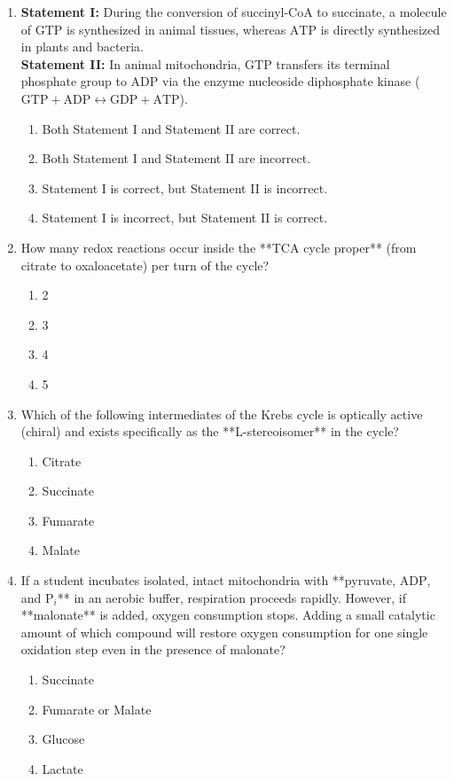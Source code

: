 \documentclass[11pt, a4paper]{article}
\begin{document}
\begin{enumerate}[label=\textbf{\arabic*.}]
\item \textbf{Statement I:} During the conversion of succinyl-CoA to succinate, a molecule of $\text{GTP}$ is synthesized in animal tissues, whereas $\text{ATP}$ is directly synthesized in plants and bacteria. \\
\textbf{Statement II:} In animal mitochondria, $\text{GTP}$ transfers its terminal phosphate group to $\text{ADP}$ via the enzyme nucleoside diphosphate kinase ($\text{GTP} + \text{ADP} \leftrightarrow \text{GDP} + \text{ATP}$).
\begin{enumerate}[label=(\Alph*)]
    \item Both Statement I and Statement II are correct.
    \item Both Statement I and Statement II are incorrect.
    \item Statement I is correct, but Statement II is incorrect.
    \item Statement I is incorrect, but Statement II is correct.
\end{enumerate}

\item How many redox reactions occur inside the **TCA cycle proper** (from citrate to oxaloacetate) per turn of the cycle?
\begin{enumerate}[label=(\Alph*)]
    \item 2
    \item 3
    \item 4
    \item 5
\end{enumerate}

\item Which of the following intermediates of the Krebs cycle is optically active (chiral) and exists specifically as the **L-stereoisomer** in the cycle?
\begin{enumerate}[label=(\Alph*)]
    \item Citrate
    \item Succinate
    \item Fumarate
    \item Malate
\end{enumerate}

\item If a student incubates isolated, intact mitochondria with **pyruvate, $\text{ADP}$, and $\text{P}_i$** in an aerobic buffer, respiration proceeds rapidly. However, if **malonate** is added, oxygen consumption stops. Adding a small catalytic amount of which compound will restore oxygen consumption for one single oxidation step even in the presence of malonate?
\begin{enumerate}[label=(\Alph*)]
    \item Succinate
    \item Fumarate or Malate
    \item Glucose
    \item Lactate
\end{enumerate}


\end{enumerate}
\end{document}
